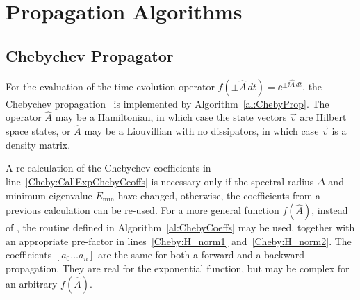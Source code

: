 \chapter{Propagation Algorithms}
\label{AppendixAlgos}

\section{Chebychev Propagator}

For the evaluation of the time evolution operator
$f(\pm\hat{A}\,dt) = \ee^{\pm\ii \hat{A}\,dt}$, the Chebychev
propagation~\cite{KosloffJCP88, NdongJCP09}
is implemented by Algorithm~\ref{al:ChebyProp}. The operator $\hat{A}$ may be
a Hamiltonian, in which case the state vectors $\vec{v}$ are Hilbert space
states, or $\hat{A}$ may be a Liouvillian with no dissipators, in which case
$\vec{v}$ is a density matrix.

A re-calculation of the Chebychev coefficients in
line~\ref{Cheby:CallExpChebyCeoffs} is necessary only if the spectral
radius $\Delta$ and minimum eigenvalue $E_{\min}$ have changed, otherwise, the
coefficients from a previous calculation can be re-used. For a more general
function $f(\hat{A})$, instead of , the routine
 defined in Algorithm~\ref{al:ChebyCoeffs} may be used,
together with an appropriate pre-factor in lines~\ref{Cheby:H_norm1}
and~\ref{Cheby:H_norm2}. The coefficients $[a_0 \dots a_n]$ are the same for
both a forward and a backward propagation.
They are real for the exponential function, but may be complex for an arbitrary
$f(\hat{A})$.

